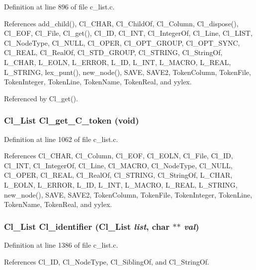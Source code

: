 Definition at line 896 of file c\_\-list.c.

References add\_\-child(), Cl\_\-CHAR, Cl\_\-Child\-Of, Cl\_\-Column, Cl\_\-dispose(), Cl\_\-EOF, Cl\_\-File, Cl\_\-get(), Cl\_\-ID, Cl\_\-INT, Cl\_\-Integer\-Of, Cl\_\-Line, Cl\_\-LIST, Cl\_\-Node\-Type, Cl\_\-NULL, Cl\_\-OPER, Cl\_\-OPT\_\-GROUP, Cl\_\-OPT\_\-SYNC, Cl\_\-REAL, Cl\_\-Real\-Of, Cl\_\-STD\_\-GROUP, Cl\_\-STRING, Cl\_\-String\-Of, L\_\-CHAR, L\_\-EOLN, L\_\-ERROR, L\_\-ID, L\_\-INT, L\_\-MACRO, L\_\-REAL, L\_\-STRING, lex\_\-punt(), new\_\-node(), SAVE, SAVE2, Token\-Column, Token\-File, Token\-Integer, Token\-Line, Token\-Name, Token\-Real, and yylex.

Referenced by Cl\_\-get().
\subsubsection{\setlength{\rightskip}{0pt plus 5cm}\bf{Cl\_\-List} Cl\_\-get\_\-C\_\-token (void)}\label{c__list_8c_89d793d5f6acdec1fe5b839464e2f6d2}




Definition at line 1062 of file c\_\-list.c.

References Cl\_\-CHAR, Cl\_\-Column, Cl\_\-EOF, Cl\_\-EOLN, Cl\_\-File, Cl\_\-ID, Cl\_\-INT, Cl\_\-Integer\-Of, Cl\_\-Line, Cl\_\-MACRO, Cl\_\-Node\-Type, Cl\_\-NULL, Cl\_\-OPER, Cl\_\-REAL, Cl\_\-Real\-Of, Cl\_\-STRING, Cl\_\-String\-Of, L\_\-CHAR, L\_\-EOLN, L\_\-ERROR, L\_\-ID, L\_\-INT, L\_\-MACRO, L\_\-REAL, L\_\-STRING, new\_\-node(), SAVE, SAVE2, Token\-Column, Token\-File, Token\-Integer, Token\-Line, Token\-Name, Token\-Real, and yylex.
\subsubsection{\setlength{\rightskip}{0pt plus 5cm}\bf{Cl\_\-List} Cl\_\-identifier (\bf{Cl\_\-List} {\em list}, char $\ast$$\ast$ {\em val})}\label{c__list_8c_dda84882bcbab381e8e93bbd4a82e611}




Definition at line 1386 of file c\_\-list.c.

References Cl\_\-ID, Cl\_\-Node\-Type, Cl\_\-Sibling\-Of, and Cl\_\-String\-Of.
